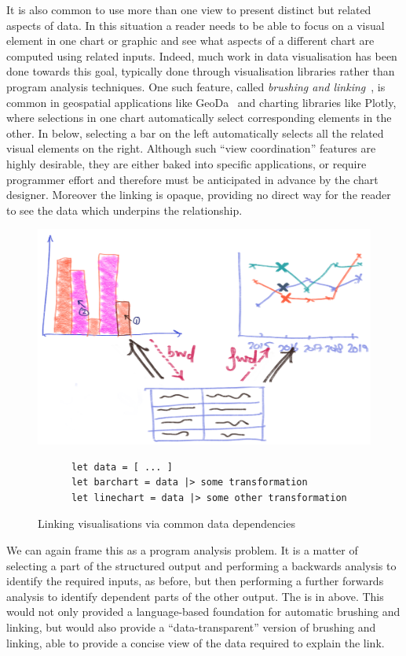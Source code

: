 It is also common to use more than one view to present distinct but related aspects of data. In this situation a reader needs to be able to focus on a visual element in one chart or graphic and see what aspects of a different chart are computed using related inputs. Indeed, much work in data visualisation has been done towards this goal, typically done through visualisation libraries rather than program analysis techniques. One such feature, called \emph{brushing and linking}~\cite{becker87}, is common in geospatial applications like GeoDa~\cite{anselin06} and charting libraries like Plotly, where selections in one chart automatically select corresponding elements in the other. In  below, selecting a bar on the left automatically selects all the related visual elements on the right. Although such ``view coordination'' features are highly desirable, they are either baked into specific applications, or require programmer effort and therefore must be anticipated in advance by the chart designer. Moreover the linking is opaque, providing no direct way for the reader to see the data which underpins the relationship.

\begin{figure}[H]
   {\includegraphics[scale=0.14]{fig/example/vis-linking.png}}
   \small
   \begin{lstlisting}
      let data = [ ... ]
      let barchart = data |> some transformation
      let linechart = data |> some other transformation
   \end{lstlisting}
   \caption{Linking visualisations via common data dependencies}
   \label{fig:introduction:vis-linking}
\end{figure}

We can again frame this as a program analysis problem. It is a matter of selecting a part of the structured output and performing a backwards analysis to identify the required inputs, as before, but then performing a further forwards analysis to identify dependent parts of the other output. The is in  above. This would not only provided a language-based foundation for automatic brushing and linking, but would also provide a ``data-transparent'' version of brushing and linking, able to provide a concise view of the data required to explain the link.

